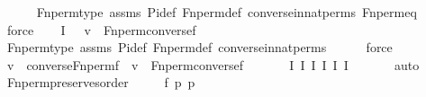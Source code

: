 \begin{isabellebody}
\ \ \ \ \isamarkupfalse%
\ Fn{\isacharunderscore}{\kern0pt}perm{\isacharprime}{\kern0pt}{\isacharunderscore}{\kern0pt}type\ assms\ Pi{\isacharunderscore}{\kern0pt}def\ Fn{\isacharunderscore}{\kern0pt}perm{\isacharprime}{\kern0pt}{\isacharunderscore}{\kern0pt}def\ converse{\isacharunderscore}{\kern0pt}in{\isacharunderscore}{\kern0pt}nat{\isacharunderscore}{\kern0pt}perms\ Fn{\isacharunderscore}{\kern0pt}perm{\isacharprime}{\kern0pt}{\isacharunderscore}{\kern0pt}eq\isanewline
\ \ \ \ \isamarkupfalse%
\ force\isanewline
\ \ \isamarkupfalse%
\ I{}{\isacharcolon}{\kern0pt}\ {\isachardoublequoteopen}{\isachardot}{\kern0pt}{\isachardot}{\kern0pt}{\isachardot}{\kern0pt}\ {\isasymlongleftrightarrow}\ v\ {\isasymin}\ Fn{\isacharunderscore}{\kern0pt}perm{\isacharprime}{\kern0pt}{\isacharparenleft}{\kern0pt}converse{\isacharparenleft}{\kern0pt}f{\isacharparenright}{\kern0pt}{\isacharparenright}{\kern0pt}{\isachardoublequoteclose}\ \isanewline
\ \ \ \ \isamarkupfalse%
\ Fn{\isacharunderscore}{\kern0pt}perm{\isacharprime}{\kern0pt}{\isacharunderscore}{\kern0pt}type\ assms\ Pi{\isacharunderscore}{\kern0pt}def\ Fn{\isacharunderscore}{\kern0pt}perm{\isacharprime}{\kern0pt}{\isacharunderscore}{\kern0pt}def\ converse{\isacharunderscore}{\kern0pt}in{\isacharunderscore}{\kern0pt}nat{\isacharunderscore}{\kern0pt}perms\isanewline
\ \ \ \ \isamarkupfalse%
\ force\isanewline
\ \ \isamarkupfalse%
\ {\isachardoublequoteopen}v\ {\isasymin}\ converse{\isacharparenleft}{\kern0pt}Fn{\isacharunderscore}{\kern0pt}perm{\isacharprime}{\kern0pt}{\isacharparenleft}{\kern0pt}f{\isacharparenright}{\kern0pt}{\isacharparenright}{\kern0pt}\ {\isasymlongleftrightarrow}\ v\ {\isasymin}\ Fn{\isacharunderscore}{\kern0pt}perm{\isacharprime}{\kern0pt}{\isacharparenleft}{\kern0pt}converse{\isacharparenleft}{\kern0pt}f{\isacharparenright}{\kern0pt}{\isacharparenright}{\kern0pt}{\isachardoublequoteclose}\ \isanewline
\ \ \ \ \isamarkupfalse%
\ I{}\ I{}\ I{}\ I{}\ I{}\ I{}\ \isanewline
\ \ \ \ \isamarkupfalse%
\ auto\isanewline
{}\isamarkupfalse%
%
\endisatagproof
{\isafoldproof}%
%
\isadelimproof
\isanewline
%
\endisadelimproof
\isanewline
{}\isamarkupfalse%
\ Fn{\isacharunderscore}{\kern0pt}perm{\isacharprime}{\kern0pt}{\isacharunderscore}{\kern0pt}preserves{\isacharunderscore}{\kern0pt}order\ {\isacharcolon}{\kern0pt}\ \isanewline
\ \ \ f\ p\ p{\isacharprime}{\kern0pt}\ \isanewline

\end{isabellebody}
